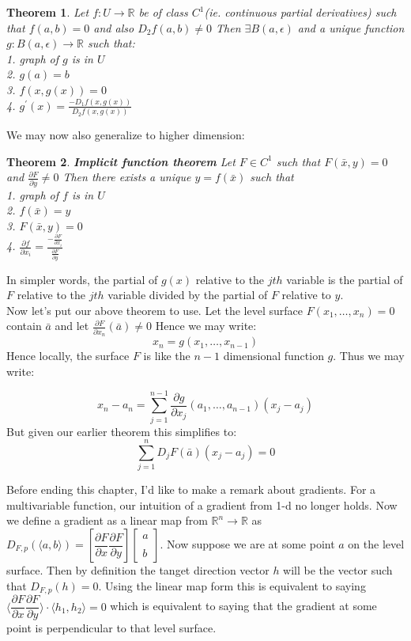 \documentclass[titlepage]{article}
\newtheorem{theorem}{Theorem}[section]
\newcommand{\Rn}{\mathbb{R}^n}
\begin{document}
\begin{theorem}
Let $f: U \to \mathbb{R}$ be of class $C^{1}$(ie. continuous partial derivatives) such that $f(a,b) = 0$ and also $D_{2}f(a,b) \not = 0$ Then $\exists B(a,\epsilon)$ and a unique function $g: B(a,\epsilon) \to \mathbb{R}$ such that:
\\
1. graph of $g$ is in $U$
\\
2. $g(a) = b$
\\
3. $f(x,g(x)) =0$
\\
4. $g^{\prime}(x) = \frac{-D_{1}f(x,g(x))}{D_{2}f(x,g(x))}$
\end{theorem}

We may now also generalize to higher dimension:

\begin{theorem} \textbf{Implicit function theorem}
Let $F \in C^{1}$ such that $F(\bar{x},y)=0$ and $\frac{\partial F}{\partial y} \not=0$ Then there exists a unique $y = f(\bar{x})$ such that
\\
1. graph of $f$ is in $U$
\\
2. $f(\bar{x}) = y$
\\
3. $F(\bar{x},y) =0$
\\
4. $\frac{\partial f}{\partial x_{i}} = \frac{ - \frac{\partial F}{\partial x_{i}}}{\frac{  \partial F}{\partial y}}$
\end{theorem}

In simpler words, the partial of $g(x)$ relative to the $jth$ variable is the partial of $F$ relative to the $jth$ variable divided by the partial of $F$ relative to $y$. 
\\

Now let's put our above theorem to use. Let the level surface $F(x_{1},\ldots, x_{n}) = 0$ contain $\bar{a}$ and let $\frac{\partial F}{\partial x_{n}}(\bar{a}) \not = 0$ Hence we may write:
$$x_{n} = g(x_{1},\ldots,x_{n-1})$$ Hence locally, the surface $F$ is like the $n-1$ dimensional function $g$. Thus we may write:

$$x_{n}-a_{n} = \sum_{j=1}^{n-1} \frac{\partial g}{\partial x_{j}} (a_{1},\ldots, a_{n-1})(x_{j}-a_{j})$$ But given our earlier theorem this simplifies to:
$$\sum_{j=1}^{n} D_{j}F(\bar{a})(x_{j}-a_{j}) = 0 $$

Before ending this chapter, I'd like to make a remark about gradients. For a multivariable function, our intuition of a gradient from 1-d no longer holds. Now we define a gradient as a linear map from $\Rn \to \mathbb{R}$ as $D_{F,p}(\langle a,b \rangle) = [ \dfrac{\partial F}{\partial x} \dfrac{\partial F}{\partial y}] \begin{bmatrix}a \\\\ b\end{bmatrix}$. Now suppose we are at some point $a$ on the level surface. Then by definition the tanget direction vector $h$ will be the vector such that $D_{F,p}(h) = 0$. Using the linear map form this is equivalent to saying $\langle \dfrac{\partial F}{\partial x} \dfrac{\partial F}{\partial y} \rangle \cdot \langle h_{1}, h_{2}\rangle = 0$ which is equivalent to saying that the gradient at some point is perpendicular to that level surface.
\end{document}

